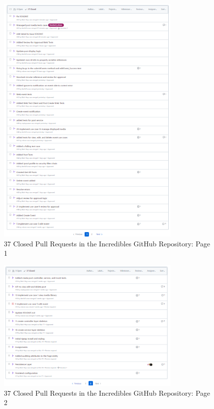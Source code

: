 \begin{figure}[H]
    \centering
    \includegraphics[width=0.8\textwidth]{images/PullRequests1.png}
    \centering
    \caption{37 Closed Pull Requests in the Incredibles GitHub Repository: Page 1}
\end{figure}

\begin{figure}[H]
    \centering
    \includegraphics[width=0.8\textwidth]{images/PullRequests2.png}
    \centering
    \caption{37 Closed Pull Requests in the Incredibles GitHub Repository: Page 2}
\end{figure}

